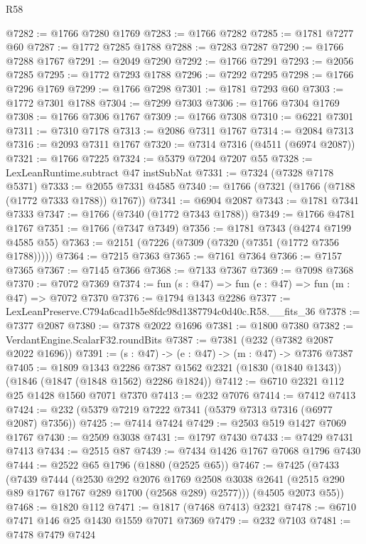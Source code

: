 \begin{lexlean}{R58}
\begin{coremodule}
@7282 := @1766 @7280 @1769
@7283 := @1766 @7282
@7285 := @1781 @7277 @60
@7287 := @1772 @7285 @1788
@7288 := @7283 @7287
@7290 := @1766 @7288 @1767
@7291 := @2049 @7290
@7292 := @1766 @7291
@7293 := @2056 @7285
@7295 := @1772 @7293 @1788
@7296 := @7292 @7295
@7298 := @1766 @7296 @1769
@7299 := @1766 @7298
@7301 := @1781 @7293 @60
@7303 := @1772 @7301 @1788
@7304 := @7299 @7303
@7306 := @1766 @7304 @1769
@7308 := @1766 @7306 @1767
@7309 := @1766 @7308
@7310 := @6221 @7301
@7311 := @7310 @7178
@7313 := @2086 @7311 @1767
@7314 := @2084 @7313
@7316 := @2093 @7311 @1767
@7320 := @7314 @7316 (@4511 (@6974 @2087))
@7321 := @1766 @7225
@7324 := @5379 @7204 @7207 @55
@7328 := LexLeanRuntime.subtract @47 instSubNat
@7331 := @7324 (@7328 @7178 @5371)
@7333 := @2055 @7331 @4585
@7340 := @1766 (@7321 (@1766 (@7188 (@1772 @7333 @1788)) @1767))
@7341 := @6904 @2087
@7343 := @1781 @7341 @7333
@7347 := @1766 (@7340 (@1772 @7343 @1788))
@7349 := @1766 @4781 @1767
@7351 := @1766 (@7347 @7349)
@7356 := @1781 @7343 (@4274 @7199 @4585 @55)
@7363 := @2151 (@7226 (@7309 (@7320 (@7351 (@1772 @7356 @1788)))))
@7364 := @7215 @7363
@7365 := @7161 @7364
@7366 := @7157 @7365
@7367 := @7145 @7366
@7368 := @7133 @7367
@7369 := @7098 @7368
@7370 := @7072 @7369
@7374 := fun (s : @47) => fun (e : @47) => fun (m : @47) => @7072 @7370
@7376 := @1794 @1343 @2286
@7377 := LexLeanPreserve.C794a6cad1b5e8fdc98d1387794c0d40c.R58.__fits_36
@7378 := @7377 @2087
@7380 := @7378 @2022 @1696
@7381 := @1800 @7380
@7382 := VerdantEngine.ScalarF32.roundBits
@7387 := @7381 (@232 (@7382 @2087 @2022 @1696))
@7391 := (s : @47) -> (e : @47) -> (m : @47) -> @7376 @7387
@7405 := @1809
    @1343
    @2286
    @7387
    @1562
    @2321
    (@1830 (@1840 @1343))
    (@1846 (@1847 (@1848 @1562) @2286 @1824))
@7412 := @6710 @2321 @112 @25 @1428 @1560 @7071 @7370
@7413 := @232 @7076
@7414 := @7412 @7413
@7424 := @232 (@5379 @7219 @7222 @7341 (@5379 @7313 @7316 (@6977 @2087) @7356))
@7425 := @7414 @7424
@7429 := @2503 @519 @1427 @7069 @1767
@7430 := @2509 @3038
@7431 := @1797 @7430
@7433 := @7429 @7431 @7413
@7434 := @2515 @87
@7439 := @7434 @1426 @1767 @7068 @1796 @7430
@7444 := @2522 @65 @1796 (@1880 (@2525 @65))
@7467 := @7425
    (@7433
      (@7439
        @7444
        (@2530
          @292
          @2076
          @1769
          @2508
          @3038
          @2641
          (@2515 @290 @89 @1767 @1767 @289 @1700 (@2568 @289) @2577)))
      (@4505 @2073 @55))
@7468 := @1820 @112
@7471 := @1817 (@7468 @7413) @2321
@7478 := @6710 @7471 @146 @25 @1430 @1559 @7071 @7369
@7479 := @232 @7103
@7481 := @7478 @7479 @7424

\end{coremodule}
\end{lexlean}
